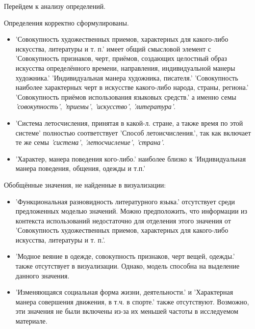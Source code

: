 Перейдем к анализу определений.

Определения корректно сформулированы.

\begin{itemize}
    \item ’Совокупность художественных приемов, характерных для какого-либо искусства, литературы и т. п.’ имеет общий смысловой элемент с
’Совокупность признаков, черт, приёмов, создающих целостный образ искусства определённого времени, направления, индивидуальной манеры художника.’
’Индивидуальная манера художника, писателя.’
’Совокупность наиболее характерных черт в искусстве какого-либо народа, страны, региона.’
’Совокупность приёмов использования языковых средств.’
а именно семы \textit{’совокупность’}, \textit{’приемы’}, \textit{’искусство’}, \textit{’литература’}.

    \item ’Система летосчисления, принятая в какой-л. стране, а также время по этой системе’ полностью соответствует
’Способ летоисчисления.’, так как включает те же семы \textit{’система’}, \textit{’летосчисление’}, \textit{’страна’}.
\end{itemize}

\begin{itemize}
    \item ’Характер, манера поведения кого-либо.’ наиболее близко к
’Индивидуальная манера поведения, общения, одежды и т.п.’
\end{itemize}

Обобщённые значения, не найденные в визуализации:
\begin{itemize}
    \item ’Функциональная разновидность литературного языка.’ отсутствует среди предложенных моделью значений.
Можно предположить, что информации из контекста использований недостаточно для отделения этого значения от ’Совокупность художественных приемов, характерных для какого-либо искусства, литературы и т. п.’.

    \item ’Модное веяние в одежде, совокупность признаков, черт вещей, одежды.’ также отсутствует в визуализации.
Однако, модель способна на выделение данного значения.

    \item ’Изменяющаяся социальная форма жизни, деятельности.’ и ’Характерная манера совершения движения, в т.ч. в спорте.’ также отсутствуют.
Возможно, эти значения не были включены из-за их меньшей частоты в исследуемом материале.
\end{itemize}

